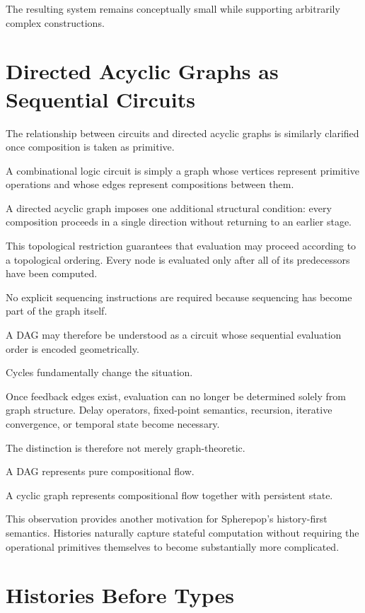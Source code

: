 \documentclass[12pt,oneside]{article}
\begin{document}
The resulting system remains conceptually small while supporting arbitrarily complex constructions.

\section{Directed Acyclic Graphs as Sequential Circuits}

The relationship between circuits and directed acyclic graphs is similarly clarified once composition is taken as primitive.

A combinational logic circuit is simply a graph whose vertices represent primitive operations and whose edges represent compositions between them.

A directed acyclic graph imposes one additional structural condition: every composition proceeds in a single direction without returning to an earlier stage.

This topological restriction guarantees that evaluation may proceed according to a topological ordering. Every node is evaluated only after all of its predecessors have been computed.

No explicit sequencing instructions are required because sequencing has become part of the graph itself.

A DAG may therefore be understood as a circuit whose sequential evaluation order is encoded geometrically.

Cycles fundamentally change the situation.

Once feedback edges exist, evaluation can no longer be determined solely from graph structure. Delay operators, fixed-point semantics, recursion, iterative convergence, or temporal state become necessary.

The distinction is therefore not merely graph-theoretic.

A DAG represents pure compositional flow.

A cyclic graph represents compositional flow together with persistent state.

This observation provides another motivation for Spherepop's history-first semantics. Histories naturally capture stateful computation without requiring the operational primitives themselves to become substantially more complicated.

\section{Histories Before Types}
\end{document}
